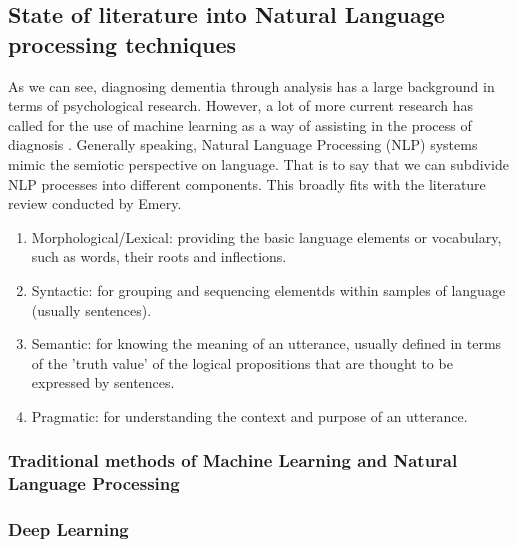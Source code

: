 \documentclass[12pt, twoside, a4paper]{article}
\begin{document}
\subsection{State of literature into Natural Language processing techniques}
As we can see, diagnosing dementia through analysis has a large background in terms of psychological research. However, a lot of more current research has called for the use of machine learning as a way of assisting in the process of diagnosis \cite{Boschi2017}. Generally speaking, Natural Language Processing (NLP) systems mimic the semiotic perspective on language. That is to say that we can subdivide NLP processes into different components. This broadly fits with the literature review conducted by Emery.
\begin{enumerate}
	\item Morphological/Lexical: providing the basic language elements or vocabulary, such as words, their roots and inflections.
	\item Syntactic: for grouping and sequencing elementds within samples of language (usually sentences).
	\item Semantic: for knowing the meaning of an utterance, usually defined in terms of the 'truth value' of the logical propositions that are thought to be expressed by sentences.
	\item Pragmatic: for understanding the context and purpose of an utterance.
\end{enumerate}
\subsubsection{Traditional methods of Machine Learning and Natural Language Processing}

\subsubsection{Deep Learning}
\end{document}
